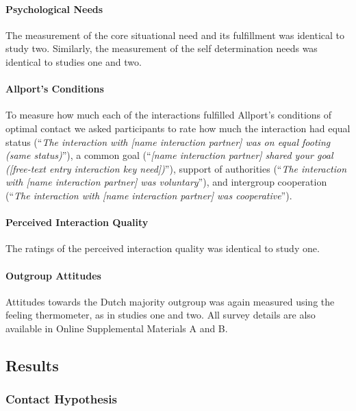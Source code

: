 \documentclass[man, 12pt, a4paper]{apa7}
\theoremstyle{break}
\theoremstyle{plain}
\begin{document}
\paragraph{Psychological Needs}

The measurement of the core situational need and its fulfillment was
identical to study two. Similarly, the measurement of the self
determination needs was identical to studies one and two.

\paragraph{Allport's Conditions}

To measure how much each of the interactions fulfilled Allport's
conditions of optimal contact we asked participants to rate how much the
interaction had equal status
(``\textit{The interaction with [name interaction partner] was on equal footing (same status)}''),
a common goal
(``\textit{[name interaction partner] shared your goal ([free-text entry interaction key need])}''),
support of authorities
(``\textit{The interaction with [name interaction partner] was voluntary}''),
and intergroup cooperation
(``\textit{The interaction with [name interaction partner] was cooperative}'').

\paragraph{Perceived Interaction Quality}

The ratings of the perceived interaction quality was identical to study
one.

\paragraph{Outgroup Attitudes}

Attitudes towards the Dutch majority outgroup was again measured using
the feeling thermometer, as in studies one and two. All survey details
are also available in Online Supplemental Materials A and B.

\subsection{Results}

\subsubsection{Contact Hypothesis}
\end{document}
